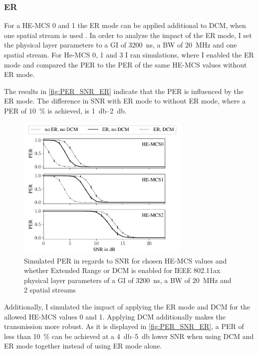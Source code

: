 \subsubsection*{\acf{ER}}
For a \ac{HE}-\ac{MCS} \num{0} and \num{1} the \ac{ER} mode can be applied additional to \ac{DCM}, when one spatial stream is used \cite{ieee_standard_2021ax}.
In order to analyze the impact of the \ac{ER} mode, I set the physical layer parameters to a \ac{GI} of
\SI{3200}{\nano\second}, a \ac{BW} of \SI{20}{\mega\hertz} and one spatial stream.
For He-\ac{MCS} \num{0}, \num{1} and \num{3} I ran simulations, where I enabled the
\ac{ER} mode and compared the \ac{PER} to the \ac{PER} of the same \ac{HE}-\ac{MCS} values without \ac{ER} mode.

The results in \autoref{fig:PER_SNR_ER} indicate that the \ac{PER} is influenced by the \ac{ER} mode.
The difference in \ac{SNR} with \ac{ER} mode to without \ac{ER} mode, where a \ac{PER}
of \SI{10}{\percent} is achieved, is \SIrange{1}{2}{\decibel}.

\begin{figure}%
   \centering
   \includegraphics[width=0.74\textwidth]{figures/ER_PER_to_SNR.pdf}
   \caption{Simulated \ac{PER} in regards to \ac{SNR} for chosen \ac{HE}-\ac{MCS} values and whether Extended Range or \ac{DCM}
   is enabled for IEEE 802.11ax physical layer parameters of a \ac{GI} of \SI{3200}{\nano\second}, a \ac{BW} of \SI{20}{\mega\hertz} and 2 spatial streams}
   \label{fig:PER_SNR_ER}%
\end{figure}

Additionally, I simulated the impact of applying the \ac{ER} mode and \ac{DCM} for the allowed \ac{HE}-\ac{MCS} values \num{0} and \num{1}.
Applying \ac{DCM} additionally makes the transmission more robust.
As it is displayed in \autoref{fig:PER_SNR_ER},
a \ac{PER} of less than \SI{10}{\percent} can be achieved at a \SIrange{4}{5}{\decibel} lower \ac{SNR} when using \ac{DCM} and \ac{ER} mode together instead
of using \ac{ER} mode alone.

